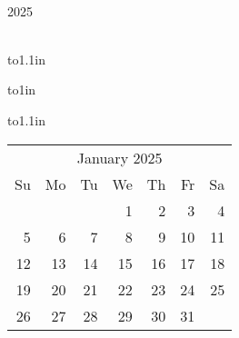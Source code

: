 \documentclass[12pt]{article}
\newlength{\cellwidth}
\newlength{\cellheight}
\begin{document}
% 
\pagestyle{empty}%
\setlength{\cellwidth}{18cm}%
\setlength{\cellwidth}{0.157143\cellwidth}
\setlength{\cellheight}{24cm}%
\setlength{\cellheight}{1.000000\cellheight}
\ \par{}%
\vspace*{-3cm}%
\vspace*{-3.1cm}%
\vfill%
\begin{center}%
{\Huge 2025}%
\end{center}%
\vspace*{1cm}%
\begin{center}%
\parbox[l]{4.3in}{%

\noindent\\%
\def\month{\hbox to1.1in{%
\vbox to1in{%
\vfil  \hbox to1.1in{%
\hfil\scriptsize\begin{tabular}{@{\hspace{0mm}}r@{\hspace{1mm}}r@{\hspace{1mm}}r@{\hspace{1mm}}r@{\hspace{1mm}}r@{\hspace{1mm}}r@{\hspace{1mm}}r@{\hspace{0mm}}}%
\multicolumn{7}{c}{January 2025}\\[1mm]
Su & Mo & Tu & We & Th & Fr & Sa\\[0.7mm]
 &  &  & 1 & 2 & 3 & 4\\[0.5mm]
5 & 6 & 7 & 8 & 9 & 10 & 11\\[0.5mm]
12 & 13 & 14 & 15 & 16 & 17 & 18\\[0.5mm]
19 & 20 & 21 & 22 & 23 & 24 & 25\\[0.5mm]
26 & 27 & 28 & 29 & 30 & 31 & 
\end{tabular}\hfil}\vfil}}}%
\month\hspace*{0.5in}%
\def\month{\hbox to1.1in{%
\vbox to1in{%
\vfil  \hbox to1.1in{%
\hfil\scriptsize\begin{tabular}{@{\hspace{0mm}}r@{\hspace{1mm}}r@{\hspace{1mm}}r@{\hspace{1mm}}r@{\hspace{1mm}}r@{\hspace{1mm}}r@{\hspace{1mm}}r@{\hspace{0mm}}}%
\multicolumn{7}{c}{February 2025}\\[1mm]
Su & Mo & Tu & We & Th & Fr & Sa\\[0.7mm]

\end{tabular}}}}}}
\end{center}
\end{document}

